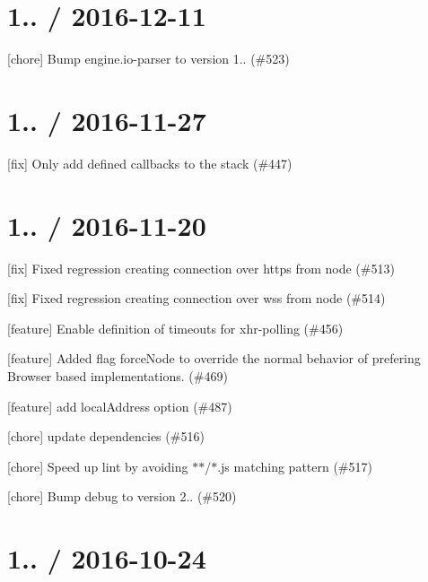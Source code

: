 \section*{1.. / 2016-\/12-\/11 }


\begin{DoxyItemize}
\item \mbox{[}chore\mbox{]} Bump engine.\+io-\/parser to version 1.. (\#523)
\end{DoxyItemize}

\section*{1.. / 2016-\/11-\/27 }


\begin{DoxyItemize}
\item \mbox{[}fix\mbox{]} Only add defined callbacks to the stack (\#447)
\end{DoxyItemize}

\section*{1.. / 2016-\/11-\/20 }


\begin{DoxyItemize}
\item \mbox{[}fix\mbox{]} Fixed regression creating connection over https from node (\#513)
\item \mbox{[}fix\mbox{]} Fixed regression creating connection over wss from node (\#514)
\item \mbox{[}feature\mbox{]} Enable definition of timeouts for xhr-\/polling (\#456)
\item \mbox{[}feature\mbox{]} Added flag force\+Node to override the normal behavior of prefering Browser based implementations. (\#469)
\item \mbox{[}feature\mbox{]} add local\+Address option (\#487)
\item \mbox{[}chore\mbox{]} update dependencies (\#516)
\item \mbox{[}chore\mbox{]} Speed up lint by avoiding \textquotesingle{}$\ast$$\ast$/$\ast$.js\textquotesingle{} matching pattern (\#517)
\item \mbox{[}chore\mbox{]} Bump debug to version 2.. (\#520)
\end{DoxyItemize}

\section*{1.. / 2016-\/10-\/24 }


